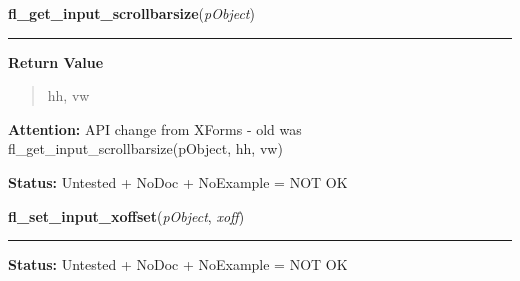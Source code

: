 \hspace{.8\funcindent}\begin{boxedminipage}{\funcwidth}

    \raggedright \textbf{fl\_get\_input\_scrollbarsize}(\textit{pObject})

    \vspace{-1.5ex}

    \rule{\textwidth}{0.5\fboxrule}
\setlength{\parskip}{2ex}
\setlength{\parskip}{1ex}
      \textbf{Return Value}
    \vspace{-1ex}

      \begin{quote}
      hh, vw

      \end{quote}

\textbf{Attention:} API change from XForms - old was fl\_get\_input\_scrollbarsize(pObject, hh,
vw)



\textbf{Status:} Untested + NoDoc + NoExample = NOT OK



    \end{boxedminipage}

    \label{xformslib:library:fl_set_input_xoffset}

    \vspace{0.5ex}

\hspace{.8\funcindent}\begin{boxedminipage}{\funcwidth}

    \raggedright \textbf{fl\_set\_input\_xoffset}(\textit{pObject}, \textit{xoff})

    \vspace{-1.5ex}

    \rule{\textwidth}{0.5\fboxrule}
\setlength{\parskip}{2ex}
\setlength{\parskip}{1ex}
\textbf{Status:} Untested + NoDoc + NoExample = NOT OK



    \end{boxedminipage}

    \label{xformslib:library:fl_get_input_xoffset}

    \vspace{0.5ex}


